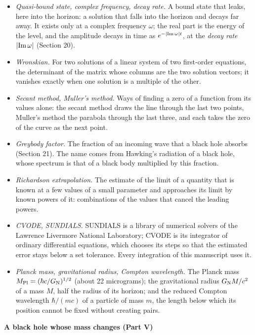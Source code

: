 \documentclass[
  10pt,
]{article}
\begin{document}
\begin{itemize}
\item
  \emph{Quasi-bound state, complex frequency, decay rate.} A bound state
  that leaks, here into the horizon: a solution that falls into the
  horizon and decays far away. It exists only at a complex frequency
  \(\omega\); the real part is the energy of the level, and the
  amplitude decays in time as \(e^{-\lvert{\rm Im}\,\omega\rvert t}\),
  at the \emph{decay rate} \(\lvert{\rm Im}\,\omega\rvert\) (Section
  20).
\item
  \emph{Wronskian.} For two solutions of a linear system of two
  first-order equations, the determinant of the matrix whose columns are
  the two solution vectors; it vanishes exactly when one solution is a
  multiple of the other.
\item
  \emph{Secant method, Muller's method.} Ways of finding a zero of a
  function from its values alone: the secant method draws the line
  through the last two points, Muller's method the parabola through the
  last three, and each takes the zero of the curve as the next point.
\item
  \emph{Greybody factor.} The fraction of an incoming wave that a black
  hole absorbs (Section 21). The name comes from Hawking's radiation of
  a black hole, whose spectrum is that of a black body multiplied by
  this fraction.
\item
  \emph{Richardson extrapolation.} The estimate of the limit of a
  quantity that is known at a few values of a small parameter and
  approaches its limit by known powers of it: combinations of the values
  that cancel the leading powers.
\item
  \emph{CVODE, SUNDIALS.} SUNDIALS is a library of numerical solvers of
  the Lawrence Livermore National Laboratory; CVODE is its integrator of
  ordinary differential equations, which chooses its steps so that the
  estimated error stays below a set tolerance. Every integration of this
  manuscript uses it.
\item
  \emph{Planck mass, gravitational radius, Compton wavelength.} The
  Planck mass \(M_{\rm Pl}=(\hbar c/G_{\rm N})^{1/2}\) (about 22
  micrograms); the gravitational radius \(G_{\rm N}M/c^2\) of a mass
  \(M\), half the radius of its horizon; and the reduced Compton
  wavelength \(\hbar/(mc)\) of a particle of mass \(m\), the length
  below which its position cannot be fixed without creating pairs.
\end{itemize}

\textbf{A black hole whose mass changes (Part V)}
\end{document}
